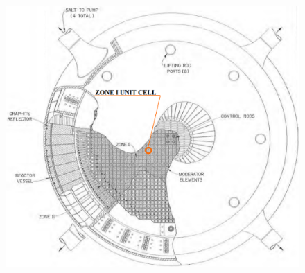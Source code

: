 \begin{frame}
\begin{columns}
\begin{figure}[t]
             \hspace*{-0.2in}
                \includegraphics[height=1.0\textwidth]{./images/plan_view_vessel.png}

      \end{figure}
  \end{columns}
              
 \end{frame}
